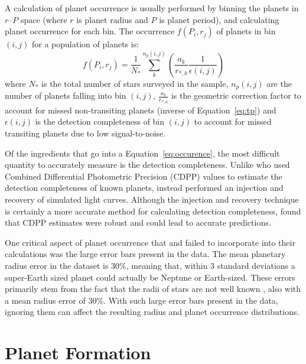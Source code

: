 A calculation of planet occurrence is usually performed by binning the planets in $r$--$P$ space (where $r$ is planet radius and $P$ is planet period), and calculating planet occurrence for each bin. 
The occurrence $f(P_i, r_j)$ of planets in bin $(i,j)$ for a population of planets is:
\begin{equation}
f(P_i, r_j) = \frac{1}{N_*} \sum_k^{n_p(i,j)} \left(\frac{a_k}{r_{*,k}} \frac{1}{\epsilon(i,j)} \right)
\label{eq:occurence}
\end{equation}
where $N_*$ is the total number of stars surveyed in the sample, $n_p(i, j)$ are the number of planets falling into bin $(i, j)$, $\frac{a_k}{r_{*,k}}$ is the geometric correction factor to account for missed non-transiting planets (inverse of Equation~\ref{eq:tp}) and $\epsilon(i,j)$ is the detection completeness of bin $(i, j)$ to account for missed transiting planets due to low signal-to-noise.

Of the ingredients that go into a Equation~\ref{eq:occurence}, the most difficult quantity to accurately measure is the detection completeness. 
Unlike \citet{Fressin2013} who used Combined Differential Photometric Precision (CDPP) values to estimate the detection completeness of known planets, \citet{Petigura2013} instead performed an injection and recovery of simulated light curves. 
Although the injection and recovery technique is certainly a more accurate method for calculating detection completeness, \citet{Fressin2013} found that CDPP estimates were robust and could lead to accurate predictions. 

One critical aspect of planet occurrence that \citet{Fressin2013} and \citet{Petigura2013} failed to incorporate into their calculations was the large error bars present in the \kep data.
The mean planetary radius error in the \citet{Batalha2013} \kep dataset is $30\%$, meaning that, within 3 standard deviations a super-Earth sized planet could actually be Neptune or Earth-sized. 
These errors primarily stem from the fact that the radii of \kep stars are not well known \citep{Brown2011}, also with a mean radius error of $30\%$.
With such large error bars present in the \kep data, ignoring them can affect the resulting radius and planet occurrence distributions.

\section{Planet Formation}
